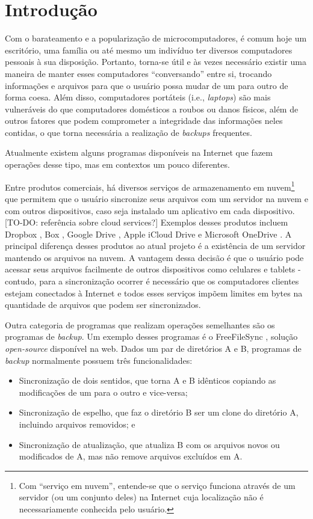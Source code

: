 \chapter{Introdução}
\label{introducao}
Com o barateamento e a popularização de microcomputadores, é comum hoje um escritório, uma família ou até mesmo um indivíduo ter diversos computadores pessoais à sua disposição.
Portanto, torna-se útil e às vezes necessário existir uma maneira de manter esses computadores ``conversando'' entre si, trocando informações e arquivos para que o usuário possa mudar de um para outro de forma coesa.
Além disso, computadores portáteis (i.e., \textit{laptops}) são mais vulneráveis do que computadores domésticos a roubos ou danos físicos, além de outros fatores que podem comprometer a integridade das informações neles contidas, o que torna necessária a realização de \textit{backups} frequentes.

Atualmente existem alguns programas disponíveis na Internet que fazem operações desse tipo, mas em contextos um pouco diferentes.

Entre produtos comerciais, há diversos serviços de armazenamento em nuvem\footnote{Com ``serviço em nuvem'', entende-se que o serviço funciona através de um servidor (ou um conjunto deles) na Internet cuja localização não é necessariamente conhecida pelo usuário.} que permitem que o usuário sincronize seus arquivos com um servidor na nuvem e com outros dispositivos, caso seja instalado um aplicativo em cada dispositivo. 
[TO-DO: referência sobre cloud services?]
Exemplos desses produtos incluem Dropbox \cite{dropbox}, Box \cite{box}, Google Drive \cite{googledrive}, Apple iCloud Drive \cite{icloud} e Microsoft OneDrive \cite{onedrive}.
A principal diferença desses produtos ao atual projeto é a existência de um servidor mantendo os arquivos na nuvem.
A vantagem dessa decisão é que o usuário pode acessar seus arquivos facilmente de outros dispositivos como celulares e tablets \-- contudo, para a sincronização ocorrer é necessário que os computadores clientes estejam conectados à Internet e todos esses serviços impõem limites em bytes na quantidade de arquivos que podem ser sincronizados.

Outra categoria de programas que realizam operações semelhantes são os programas de \textit{backup}.
Um exemplo desses programas é o FreeFileSync \cite{freefilesync}, solução \textit{open-source} disponível na web.
Dados um par de diretórios A e B, programas de \textit{backup} normalmente possuem três funcionalidades:
\begin{itemize}
    \item Sincronização de dois sentidos, que torna A e B idênticos copiando as modificações de um para o outro e vice-versa;
    \item Sincronização de espelho, que faz o diretório B ser um clone do diretório A, incluindo arquivos removidos; e
    \item Sincronização de atualização, que atualiza B com os arquivos novos ou modificados de A, mas não remove arquivos excluídos em A.
\end{itemize}

